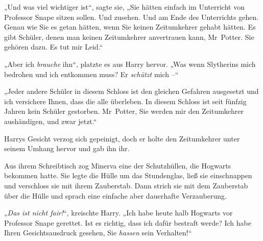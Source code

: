 „Und was viel wichtiger ist“, sagte sie, „Sie hätten einfach im Unterricht von Professor Snape sitzen sollen. Und zusehen. Und am Ende des Unterrichts gehen. Genau wie Sie es getan hätten, wenn Sie keinen Zeitumkehrer gehabt hätten. Es gibt Schüler, denen man keinen Zeitumkehrer anvertrauen kann, Mr~Potter. Sie gehören dazu. Es tut mir Leid.“

„Aber ich \emph{brauche} ihn“, platzte es aus Harry hervor. „Was wenn Slytherins mich bedrohen und ich entkommen muss? Er \emph{schützt} mich –“

„Jeder andere Schüler in diesem Schloss ist den gleichen Gefahren ausgesetzt und ich versichere Ihnen, dass die alle überleben. In diesem Schloss ist seit fünfzig Jahren kein Schüler gestorben. Mr~Potter, Sie werden mir den Zeitumkehrer aushändigen, und zwar jetzt.“

Harrys Gesicht verzog sich gepeinigt, doch er holte den Zeitumkehrer unter seinem Umhang hervor und gab ihn ihr.

Aus ihrem Schreibtisch zog Minerva eine der Schutzhüllen, die Hogwarts bekommen hatte. Sie legte die Hülle um das Stundenglas, ließ sie einschnappen und verschloss sie mit ihrem Zauberstab. Dann strich sie mit dem Zauberstab über die Hülle und sprach eine einfache aber dauerhafte Verzauberung.

„\emph{Das ist nicht fair!}“, kreischte Harry. „Ich habe heute halb Hogwarts vor Professor Snape gerettet. Ist es richtig, dass ich dafür bestraft werde? Ich habe Ihren Gesichtsausdruck gesehen, Sie \emph{hassen} sein Verhalten!“

